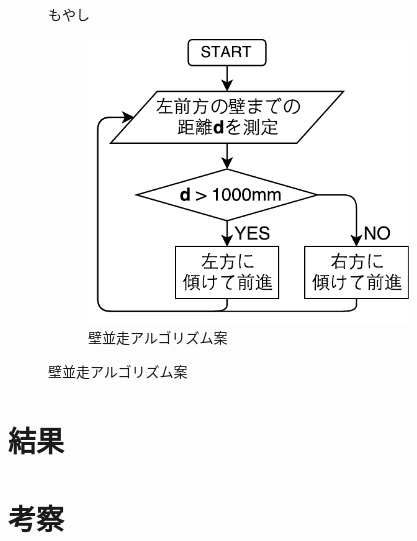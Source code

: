 \documentclass[main]{subfiles}
\begin{document}
\begin{figure}[H]
	\begin{minipage}{0.5\hsize}
		\setlength{\parindent}{1\Cwd}
		もやし
	\end{minipage}
	\begin{minipage}{0.5\hsize}
		\centering
		\begin{figure}[H]
			\centering
			\includegraphics[width=8.5cm]{img/wall_01.pdf}
			\caption{壁並走アルゴリズム案}
		\end{figure}
	\end{minipage}
\end{figure}


\section{結果}
\section{考察}
\end{document}
